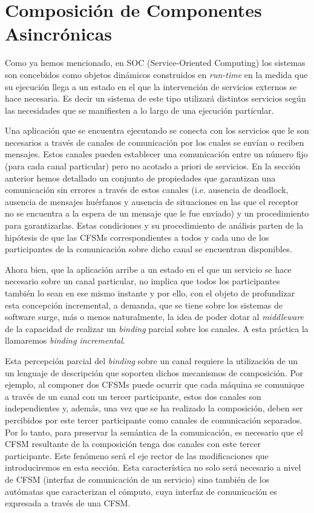 
\section{Composición de Componentes Asincrónicas}
\label{composicion}
Como ya hemos mencionado, en SOC (Service-Oriented Computing) los sistemas son concebidos como objetos dinámicos construidos en \emph{run-time} en la medida que su ejecución llega a un estado en el que la intervención de servicios externos se hace necesaria. Es decir un sistema de este tipo utilizará distintos servicios según las necesidades que se manifiesten a lo largo de una ejecución particular. 
 
Una aplicación que se encuentra ejecutando se conecta con los servicios que le son necesarios a través de canales de comunicación por los cuales se envían o reciben mensajes. Estos canales pueden establecer una comunicación entre un número fijo (para cada canal particular) pero no acotado a priori de servicios. En la sección anterior hemos detallado un conjunto de propiedades que garantizan una comunicación sin errores a través de estos canales (i.e. ausencia de deadlock, ausencia de mensajes huérfanos y ausencia de situaciones en las que el receptor no se encuentra a la espera de un mensaje que le fue enviado) y un procedimiento para garantizarlas. Estas condiciones y su procedimiento de análisis parten de la hipótesis de que las CFSMs correspondientes a todos y cada uno de los participantes de la comunicación sobre dicho canal se encuentran disponibles.

Ahora bien, que la aplicación arribe a un estado en el que un servicio se hace necesario sobre un canal particular, no implica que todos los participantes también lo sean en ese mismo instante y por ello, con el objeto de profundizar esta concepción incremental, a demanda, que se tiene sobre los sistemas de software surge, más o menos naturalmente, la idea de poder dotar al \emph{middleware} de la capacidad de realizar un \emph{binding} parcial sobre los canales. A esta práctica la llamaremos \emph{binding incremental}.
 
Esta percepción parcial del \emph{binding} sobre un canal requiere la utilización de un un lenguaje de descripción que soporten dichos mecanismos de composición. Por ejemplo, al componer dos CFSMs puede ocurrir que cada máquina se comunique a través de un canal con un tercer participante, estos dos canales son independientes y, además, una vez que se ha realizado la composición, deben ser percibidos por este tercer participante como canales de comunicación separados. Por lo tanto, para preservar la semántica de la comunicación, es necesario que el CFSM resultante de la composición tenga dos canales con este tercer participante. Este fenómeno será el eje rector de las modificaciones que introduciremos en esta sección. Esta característica no solo será necesario a nivel de CFSM (interfaz de comunicación de un servicio) sino también de los autómatas que caracterizan el cómputo, cuya interfaz de comunicación es expresada a través de una CFSM.

